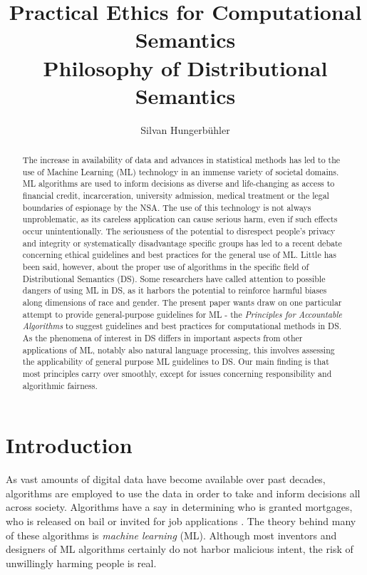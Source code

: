 \documentclass{article}
\title{Practical Ethics for Computational Semantics\\
\large Philosophy of Distributional Semantics}
\date{}
\author{Silvan Hungerb{\"u}hler}
\begin{document}
\maketitle
\begin{abstract}
The increase in availability of data and advances in statistical methods has led to the use of Machine Learning (ML) technology in an immense variety of societal domains. ML algorithms are used to inform decisions as diverse and life-changing as access to financial credit, incarceration, university admission, medical treatment or the legal boundaries of espionage by the NSA.
The use of this technology is not always unproblematic, as its careless application can cause serious harm, even if such effects occur unintentionally.
The seriousness of the potential to disrespect people's privacy and integrity or systematically disadvantage specific groups has led to a recent debate concerning ethical guidelines and best practices for the general use of ML.
Little has been said, however, about the proper use of algorithms in the specific field of Distributional Semantics (DS). Some researchers have called attention to possible dangers of using ML in DS, as it harbors the potential to reinforce harmful biases along dimensions of race and gender.
The present paper wants draw on one particular attempt to provide general-purpose guidelines for ML - the \emph{Principles for Accountable Algorithms} to suggest guidelines and best practices for computational methods in DS.
As the phenomena of interest in DS differs in important aspects from other applications of ML, notably also natural language processing,
this involves assessing the applicability of general purpose ML guidelines to DS. Our main finding is that most principles carry over smoothly, except for issues concerning responsibility and algorithmic fairness.
\end{abstract}
\section{Introduction}
As vast amounts of digital data have become available over past decades, algorithms are employed to use the data in order to take and inform decisions all across society. 
Algorithms have a say in determining who is granted mortgages, who is released on bail or invited for job applications \cite{algorithms2016}.
The theory behind many of these algorithms is \emph{machine learning} (ML).
Although most inventors and designers of ML algorithms certainly do not harbor malicious intent, the risk of unwillingly harming people is real.
\end{document}

